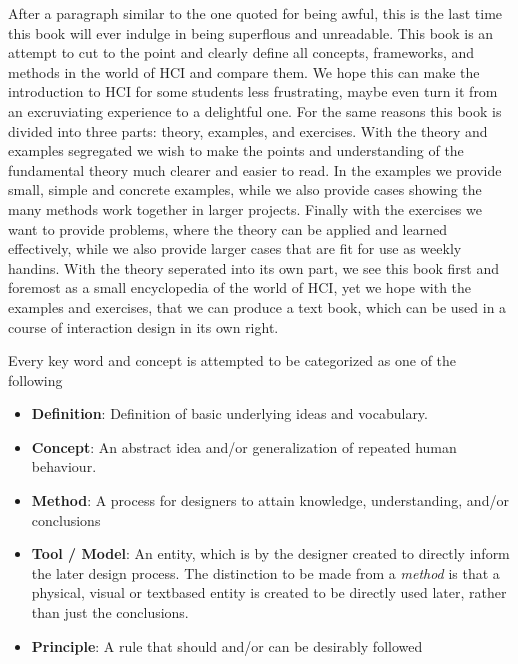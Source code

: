 After a paragraph similar to the one quoted for being awful, this is the last time this book will ever indulge in being superflous and unreadable. This book is an attempt to cut to the point and clearly define all concepts, frameworks, and methods in the world of HCI and compare them. We hope this can make the introduction to HCI for some students less frustrating, maybe even turn it from an excruviating experience to a delightful one. For the same reasons this book is divided into three parts: theory, examples, and exercises. With the theory and examples segregated we wish to make the points and understanding of the fundamental theory much clearer and easier to read. In the examples we provide small, simple and concrete examples, while we also provide cases showing the many methods work together in larger projects. Finally with the exercises we want to provide problems, where the theory can be applied and learned effectively, while we also provide larger cases that are fit for use as weekly handins. With the theory seperated into its own part, we see this book first and foremost as a small encyclopedia of the world of HCI, yet we hope with the examples and exercises, that we can produce a text book, which can be used in a course of interaction design in its own right.

Every key word and concept is attempted to be categorized as one of the following
\begin{itemize}
   \item \textbf{Definition}: Definition of basic underlying ideas and vocabulary.

   \item \textbf{Concept}: An abstract idea and/or generalization of repeated human behaviour.


   \item \textbf{Method}: A process for designers to attain knowledge, understanding, and/or conclusions

   \item \textbf{Tool / Model}: An entity, which is by the designer created to directly inform the later design process. The distinction to be made from a \emph{method} is that a physical, visual or textbased entity is created to be directly used later, rather than just the conclusions.

     \item \textbf{Principle}: A rule that should and/or can be desirably followed
\end{itemize}

